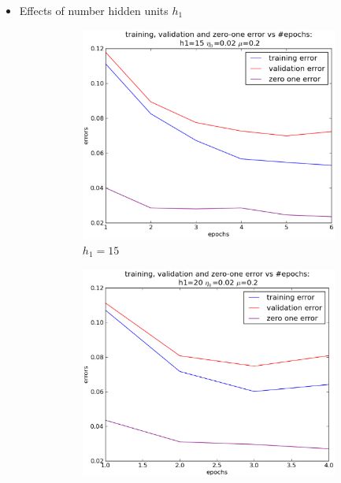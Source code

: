 \begin{itemize}
	\item Effects of number hidden units $h_1$
		\begin{figure}[!ht]
		\begin{subfigure}[b]{.4\textwidth}
		\centering
		\includegraphics[width=\textwidth]{mlp/plots/effects/15h1.eps}
		\caption{$h_1=15$}
		\label{fig:h115}
		\end{subfigure}
		\centering
		\begin{subfigure}[b]{.4\textwidth}
		\centering
		\includegraphics[width=\textwidth]{mlp/plots/effects/20h1.eps}

\end{subfigure}
\end{figure}
\end{itemize}
